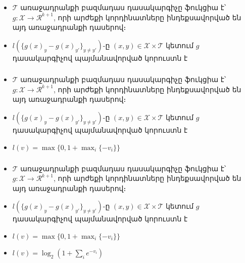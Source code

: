 \documentclass[10pt]{beamer}
\begin{document}
\begin{frame}[t]
\frametitle{}
\begin{itemize}
\vspace{5mm}
\item \armfont $\mathcal{T}$ առաջադրանքի բազմադաս դասակարգիչը ֆուկցիա է՝ $g:\mathcal{X} \rightarrow \mathcal{R}^{k+1}$, որի արժեքի կորդինատները ինդեքսավորված են այդ առաջադրանքի դասերով։

\item $l(\{ g(x)_y-g(x)_{y'}\}_{y \neq y'}  )$-ը $(x, y) \in \mathcal{X} \times \mathcal{T}$ կետում $g$ դասակարգիչով պայմանավորված կորուստն է
\end{itemize}
\end{frame}


\begin{frame}[t]
\frametitle{}
\begin{itemize}
\vspace{5mm}
\item \armfont $\mathcal{T}$ առաջադրանքի բազմադաս դասակարգիչը ֆուկցիա է՝ $g:\mathcal{X} \rightarrow \mathcal{R}^{k+1}$, որի արժեքի կորդինատները ինդեքսավորված են այդ առաջադրանքի դասերով։

\item $l(\{ g(x)_y-g(x)_{y'}\}_{y \neq y'}  )$-ը $(x, y) \in \mathcal{X} \times \mathcal{T}$ կետում $g$ դասակարգիչով պայմանավորված կորուստն է
\item $l(v) = \max\{0, 1+\max_{i}\{-v_i\}\} $
\end{itemize}
\end{frame}

\begin{frame}[t]
\frametitle{}
\begin{itemize}
\vspace{5mm}
\item \armfont $\mathcal{T}$ առաջադրանքի բազմադաս դասակարգիչը ֆուկցիա է՝ $g:\mathcal{X} \rightarrow \mathcal{R}^{k+1}$, որի արժեքի կորդինատները ինդեքսավորված են այդ առաջադրանքի դասերով։

\item $l(\{ g(x)_y-g(x)_{y'}\}_{y \neq y'}  )$-ը $(x, y) \in \mathcal{X} \times \mathcal{T}$ կետում $g$ դասակարգիչով պայմանավորված կորուստն է
\item $l(v) = \max\{0, 1+\max_{i}\{-v_i\}\} $
\item $l(v) = \log_2(1+\sum_{i}{e^{-v_i}})$
\end{itemize}
\end{frame}
\end{document}
